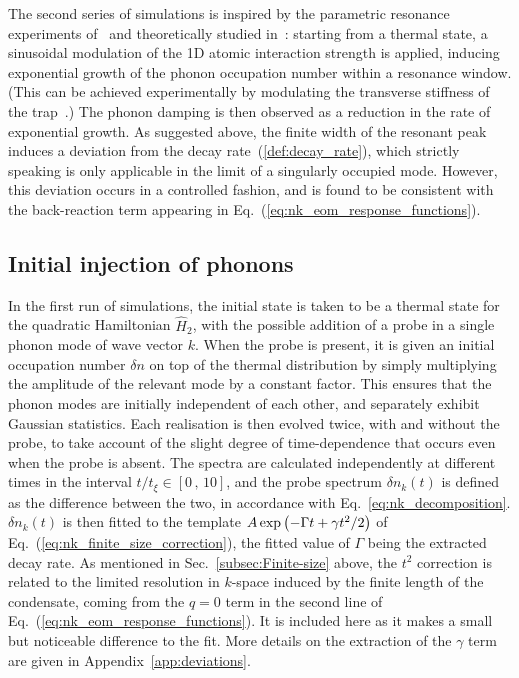 \documentclass[aps,prd,notitlepage,amsfonts,amssymb,amsmath,nofootinbib,superscriptaddress,longbibliography]{revtex4-2}
\begin{document}
The second series of simulations is inspired by the parametric resonance experiments of~\cite{Jaskula2012} and theoretically studied in~\cite{Busch-2014,Robertson_2018}: starting from a thermal state, a sinusoidal modulation of the 1D atomic interaction strength is applied, inducing exponential growth of the phonon occupation number within a resonance window. (This can be achieved experimentally by modulating the transverse stiffness of the trap~\cite{Robertson_2018,Pylak-Zin-2018,Jaskula2012}.)
The phonon damping is then observed as a reduction in the rate of exponential growth.
As suggested above, the finite width of the resonant peak induces a deviation from the decay rate~(\ref{def:decay_rate}), which strictly speaking is only applicable in the limit of a singularly occupied mode.  However, this deviation occurs in a controlled fashion, and is found to be consistent with the back-reaction term appearing in Eq.~(\ref{eq:nk_eom_response_functions}).

\subsection{Initial injection of phonons}
\label{subsec:initial_injection}

In the first run of simulations, the initial state is taken to be a thermal state for the quadratic Hamiltonian $\hat{H}_{2}$, with the possible addition of a probe in a single phonon mode of wave vector $k$.  When the probe is present, it is given an initial occupation number $\delta n$ on top of the thermal distribution by simply multiplying the amplitude of the relevant mode by a constant factor. This ensures that the phonon modes are initially independent of each other, and separately exhibit Gaussian statistics.  
Each realisation is then evolved twice, with and without the probe, to take account of the slight degree of time-dependence that occurs even when the probe is absent. The spectra are calculated independently at different times in the interval $t/t_{\xi} \in \left[0 \,,\, 10\right]$, and the probe spectrum $\delta n_{k}(t)$ is defined as the difference between the two, in accordance with Eq.~\eqref{eq:nk_decomposition}.
$\delta n_{k}(t)$ is then fitted to the template 
$A\, {\rm exp}\left(- \Gamma t + \gamma t^{2}/2\right)$
of Eq.~(\ref{eq:nk_finite_size_correction}), 
the fitted value of $\Gamma$ being the extracted decay rate.  
As mentioned in Sec.~\ref{subsec:Finite-size} above,
the $t^{2}$ correction is related to the limited resolution in $k$-space induced by the finite length of the condensate, coming from the $q=0$ term in the second line of Eq.~(\ref{eq:nk_eom_response_functions}). It is included here as it makes a small but noticeable difference to the fit.
More details on the extraction of the $\gamma$ term are given in Appendix~\ref{app:deviations}. 
\end{document}
